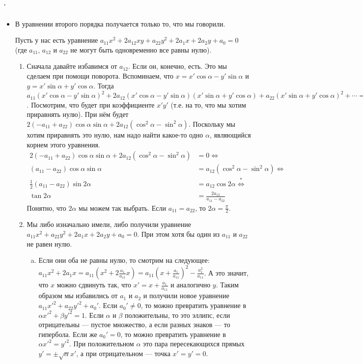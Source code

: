 \documentclass{article}
\begin{document}
    \subparagraph{.}
    \begin{itemize}
        \item[]
        \thm В уравнении второго порядка получается только то, что мы говорили.
        \begin{Proof}
            Пусть у нас есть уравнение $a_{11}x^2+2a_{12}xy+a_{22}y^2+2a_1x+2a_2y+a_0=0$ (где $a_{11}$, $a_{12}$ и $a_{22}$ не могут быть одновременно все равны нулю).
            \begin{enumerate}[1)]
                \item Сначала давайте избавимся от $a_{12}$. Если он, конечно, есть. Это мы сделаем при помощи поворота. Вспоминаем, что $x=x'\cos\alpha-y'\sin\alpha$ и $y=x'\sin\alpha+y'\cos\alpha$. Тогда $a_{11}(x'\cos\alpha-y'\sin\alpha)^2+2a_{12}(x'\cos\alpha-y'\sin\alpha)(x'\sin\alpha+y'\cos\alpha)+a_{22}(x'\sin\alpha+y'\cos\alpha)^2+\cdots=0$. Посмотрим, что будет при коэффициенте $x'y'$ (т.е. на то, что мы хотим приравнять нулю). При нём будет $2(-a_{11}+a_{22})\cos\alpha\sin\alpha+2a_{12}(\cos^2\alpha-\sin^2\alpha)$. Поскольку мы хотим приравнять это нулю, нам надо найти какое-то одно $\alpha$, являющийся корнем этого уравнения.
                \[\begin{split}
                    2(-a_{11}+a_{22})\cos\alpha\sin\alpha+2a_{12}(\cos^2\alpha-\sin^2\alpha)&=0\Leftrightarrow\\
                    (a_{11}-a_{22})\cos\alpha\sin\alpha&=a_{12}(\cos^2\alpha-\sin^2\alpha)\Leftrightarrow\\
                    \frac12(a_{11}-a_{22})\sin2\alpha&=a_{12}\cos2\alpha\overset*\Leftrightarrow\\
                    \tan2\alpha&=\frac{2a_{12}}{a_{11}-a_{22}}
                \end{split}\]
                Понятно, что $2\alpha$ мы можем так выбрать. Если $a_{11}=a_{22}$, то $2\alpha=\frac\pi2$.
                \item Мы либо изначально имели, либо получили уравнение $a_{11}x^2+a_{22}y^2+2a_1x+2a_2y+a_0=0$. При этом хотя бы один из $a_{11}$ и $a_{22}$ не равен нулю.
                \begin{enumerate}[a.]
                    \item Если они оба не равны нулю, то смотрим на следующее: $a_{11}x^2+2a_1x=a_{11}\left(x^2+2\frac{a_1}{a_{11}}x\right)=a_{11}\left(x+\frac{a_1}{a_{11}}\right)^2-\frac{a_1^2}{a_{11}}$. А это значит, что $x$ можно сдвинуть так, что $x'=x+\frac{a_1}{a_{11}}$ и аналогично $y$. Таким образом мы избавились от $a_1$ и $a_2$ и получили новое уравнение $a_{11}x'^2+a_{22}y'^2+a_0'$. Если $a_0'\neq0$, то можно превратить уравнение в $\alpha x'^2+\beta y'^2=1$. Если $\alpha$ и $\beta$ положительны, то это эллипс, если отрицательны --- пустое множество, а если разных знаков --- то гипербола. Если же $a_0'=0$, то можно превратить уравнение в $\alpha x'^2=y'^2$. При положительном $\alpha$ это пара пересекающихся прямых $y'=\pm\sqrt\alpha x'$, а при отрицательном --- точка $x'=y'=0$.

\end{enumerate}
\end{enumerate}
\end{Proof}
\end{itemize}
\end{document}
